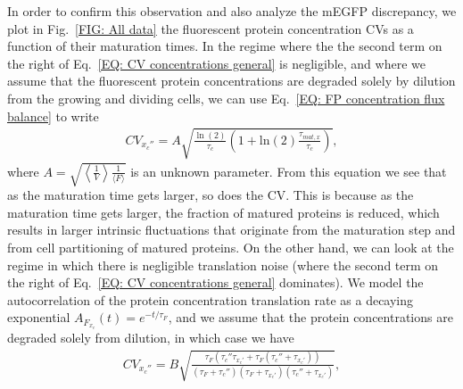 \documentclass[%
 reprint,prx,
superscriptaddress,
%
%
%
%
%
%
%
%
%
 amsmath,amssymb,
 aps,
%
%
%
%
%
%
]{revtex4-2}
\begin{document}
{{{
In order to confirm this observation and also analyze the mEGFP discrepancy, we plot in Fig.~\ref{FIG: All data} the fluorescent protein concentration CVs as a function of their maturation times. In the regime where the the second term on the right of Eq.~\eqref{EQ: CV concentrations general} is negligible, and where we assume that the fluorescent protein concentrations are degraded solely by dilution from the growing and dividing cells, we can use Eq.~\eqref{EQ: FP concentration flux balance} to write
\begin{align}
    CV_{x_{c}''} = A\sqrt{\frac{\ln(2)}{\tau_{c}}\left( 1 + \text{ln}(2)\frac{\tau_{mat,x}}{\tau_{c}}\right)},
    \label{EQ: Negligible transcription noise model}
\end{align}
where $A = \sqrt{\left \langle \frac{1}{V}\right \rangle \frac{1}{\langle F\rangle}}$ is an unknown parameter. From this equation we see that as the maturation time gets larger, so does the CV. This is because as the maturation time gets larger, the fraction of matured proteins is reduced, which results in larger intrinsic fluctuations that originate from the maturation step and from cell partitioning of matured proteins. On the other hand, we can look at the regime in which there is negligible translation noise (where the second term on the right of Eq.~\eqref{EQ: CV concentrations general} dominates). We model the autocorrelation of the protein concentration translation rate as a decaying exponential $A_{F_{x_{c}}}(t) = e^{-t/\tau_{F}}$, and we assume that the protein concentrations are degraded solely from dilution, in which case we have
\begin{align}
    CV_{x_{c}''} =  B \sqrt{\frac{\tau_{F}(\tau_{c}''\tau_{x_{c}'}+\tau_{F}(\tau_{c}'' + \tau_{x_{c}'}))}{(\tau_{F} + \tau_{c}'')(\tau_{F} + \tau_{x_{c}'})(\tau_{c}'' + \tau_{x_{c}'})}},
    \label{EQ: Negligible translation noise model} 
\end{align}
}}}
\end{document}
